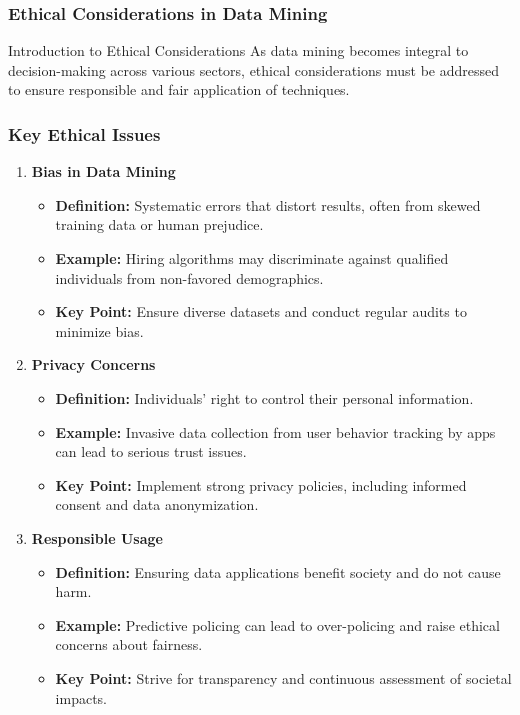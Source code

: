 \documentclass{beamer}
\begin{document}
\begin{frame}[fragile]
    \frametitle{Ethical Considerations in Data Mining}
    \begin{block}{Introduction to Ethical Considerations}
        As data mining becomes integral to decision-making across various sectors, ethical considerations must be addressed to ensure responsible and fair application of techniques.
    \end{block}
\end{frame}

\begin{frame}[fragile]
    \frametitle{Key Ethical Issues}
    \begin{enumerate}
        \item \textbf{Bias in Data Mining}
        \begin{itemize}
            \item \textbf{Definition:} Systematic errors that distort results, often from skewed training data or human prejudice.
            \item \textbf{Example:} Hiring algorithms may discriminate against qualified individuals from non-favored demographics.
            \item \textbf{Key Point:} Ensure diverse datasets and conduct regular audits to minimize bias.
        \end{itemize}
        
        \item \textbf{Privacy Concerns}
        \begin{itemize}
            \item \textbf{Definition:} Individuals' right to control their personal information.
            \item \textbf{Example:} Invasive data collection from user behavior tracking by apps can lead to serious trust issues.
            \item \textbf{Key Point:} Implement strong privacy policies, including informed consent and data anonymization.
        \end{itemize}
        
        \item \textbf{Responsible Usage}
        \begin{itemize}
            \item \textbf{Definition:} Ensuring data applications benefit society and do not cause harm.
            \item \textbf{Example:} Predictive policing can lead to over-policing and raise ethical concerns about fairness.
            \item \textbf{Key Point:} Strive for transparency and continuous assessment of societal impacts.
        \end{itemize}
    \end{enumerate}
\end{frame}
\end{document}
